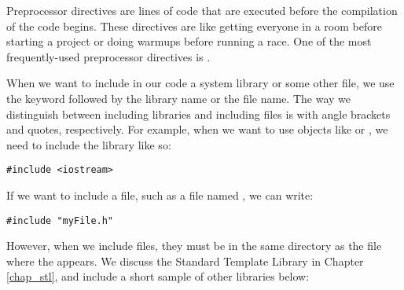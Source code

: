
Preprocessor directives are lines of code that are executed before the compilation of the code begins. 
These directives are like getting everyone in a room before starting a project or doing warmups before running a race. 
One of the most frequently-used preprocessor directives is .

When we want to include in our code a system library or some other file, we use the keyword  followed by the library name or the file name. 
The way we distinguish between including libraries and including files is with angle brackets and quotes, respectively. 
For example, when we want to use objects like  or , we need to include the  library like so: 

\noindent\begin{minipage}{\linewidth}\begin{lstlisting}
#include <iostream> 
\end{lstlisting}\end{minipage}

If we want to include a file, such as a file named , we can write: 

\noindent\begin{minipage}{\linewidth}\begin{lstlisting}
#include "myFile.h"
\end{lstlisting}\end{minipage}

However, when we include files, they must be in the same directory as the file where the  appears. 
We discuss the Standard Template Library in Chapter \ref{chap_stl}, and include a short sample of other libraries below:

